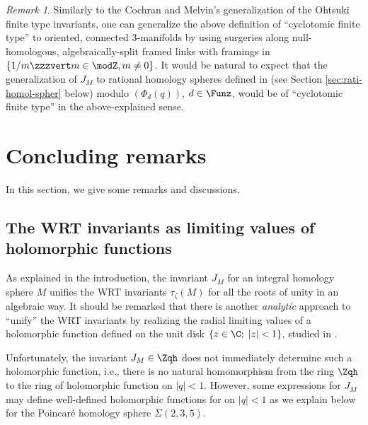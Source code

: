 \documentclass{amsart}
\numberwithin{equation}{section}
\numberwithin{figure}{section}
\theoremstyle{plain}
\theoremstyle{definition}
\theoremstyle{remark}
\newtheorem{remark}[theorem]{Remark}
\begin{document}
\begin{remark}
  \label{r38}
  Similarly to the Cochran and Melvin's generalization
  \cite{Cochran-Melvin:finitetype} of the Ohtsuki finite type
  invariants, one can generalize the above definition of ``cyclotomic
  finite type'' to oriented, connected $3$-manifolds by using
  surgeries along null-homologous, algebraically-split framed links
  with framings in $\{1/m\zzzvert m\in \modZ ,m\neq0\}$.  It would be natural to
  expect that the generalization of $J_M$ to rational homology spheres
  defined in \cite{Beliakova-Blanchet-Le,Le4} (see Section
  \ref{sec:rati-homol-spher} below) modulo $(\Phi _d(q))$, $d\in \Funz$,
  would be of ``cyclotomic finite type'' in the above-explained sense.
\end{remark}

\section{Concluding remarks}
\label{sec16}

In this section, we give some remarks and discussions.

\subsection{The WRT invariants as limiting values of holomorphic
  functions}
\label{sec:wrt-invariants-as}
As explained in the introduction, the invariant $J_M$ for an integral homology
sphere $M$ unifies the WRT invariants $\tau _\zeta (M)$ for all the roots of
unity in an algebraic way.  It should be remarked that there is
another {\em analytic} approach to ``unify'' the WRT invariants by
realizing the radial limiting values of a holomorphic function defined
on the unit disk $\{z\in \C;\;|z|<1\}$, studied in
\cite{Lawrence:integrality,Lawrence:holomorphic,Lawrence-Rozansky,Lawrence-Zagier,Hikami1,Hikami3,Hikami4,Hikami5}.

Unfortunately, the invariant $J_M\in \Zqh$ does not immediately
determine such a holomorphic function, i.e., there is no natural
homomorphism from the ring $\Zqh$ to the ring of holomorphic function
on $|q|<1$.  However, some expressions for $J_M$ may define
well-defined holomorphic functions for on $|q|<1$ as we explain below
for the Poincar\'e homology sphere $\Sigma (2,3,5)$.
\end{document}
